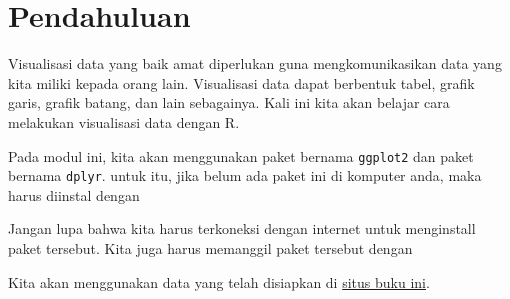 \documentclass[
]{book}
\newenvironment{Shaded}{\begin{snugshade}}{\end{snugshade}}
\newcommand{\CommentTok}[1]{\textcolor[rgb]{0.56,0.35,0.01}{\textit{#1}}}
\newcommand{\KeywordTok}[1]{\textcolor[rgb]{0.13,0.29,0.53}{\textbf{#1}}}
\newcommand{\NormalTok}[1]{#1}
\newcommand{\OperatorTok}[1]{\textcolor[rgb]{0.81,0.36,0.00}{\textbf{#1}}}
\newcommand{\StringTok}[1]{\textcolor[rgb]{0.31,0.60,0.02}{#1}}
\begin{document}
\hypertarget{pendahuluan}{%
\section{Pendahuluan}\label{pendahuluan}}

Visualisasi data yang baik amat diperlukan guna mengkomunikasikan data yang kita miliki kepada orang lain. Visualisasi data dapat berbentuk tabel, grafik garis, grafik batang, dan lain sebagainya. Kali ini kita akan belajar cara melakukan visualisasi data dengan R.

Pada modul ini, kita akan menggunakan paket bernama \texttt{ggplot2} dan paket bernama \texttt{dplyr}. untuk itu, jika belum ada paket ini di komputer anda, maka harus diinstal dengan

Jangan lupa bahwa kita harus terkoneksi dengan internet untuk menginstall paket tersebut. Kita juga harus memanggil paket tersebut dengan

Kita akan menggunakan data yang telah disiapkan di \href{https://imedkrisna.github.io/rbook}{situs buku ini}.

\begin{Shaded}
\end{Shaded}
\end{document}
